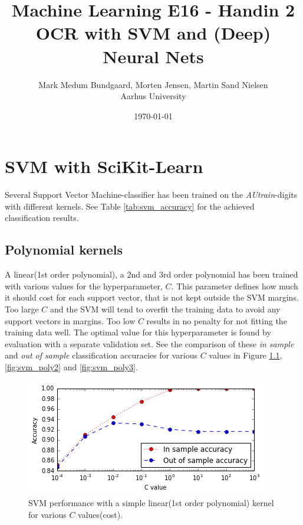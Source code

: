 \documentclass[a4paper,10pt,article,oneside,english]{memoir}
\begin{document}
	\title{Machine Learning E16 - Handin 2\\OCR with SVM and (Deep) Neural Nets}
	\author{Mark Medum Bundgaard, Morten Jensen, Martin Sand Nielsen\\ Aarhus University}
	\date{\today}
	
	\mainmatter
	\maketitle
	
	
	
	
	
	
	
\chapter{SVM with SciKit-Learn}
Several Support Vector Machine-classifier has been trained on the \emph{AUtrain}-digits with different kernels. See Table \ref{tab:svm_accuracy} for the achieved classification results. 

\section{Polynomial kernels}
A linear(1st order polynomial), a 2nd and 3rd order polynomial has been trained with various values for the hyperparameter, $C$. This parameter defines how much it should cost for each support vector, that is not kept outside the SVM margins. Too large $C$ and the SVM will tend to overfit the training data to avoid any support vectors in margins. Too low $C$ results in no penalty for not fitting the training data well. The optimal value for this hyperparameter is found by evaluation with a separate validation set. See the comparison of these \emph{in sample} and \emph{out of sample} classification accuracies for various $C$ values in Figure \ref{fig:svm_lin}, \ref{fig:svm_poly2} and \ref{fig:svm_poly3}.


\begin{figure}[h!]
	\centering
	\includegraphics[width=0.7\linewidth]{svm_lin.PNG}
	\caption{SVM performance with a simple linear(1st order polynomial) kernel for various $C$  values(cost).}
	\label{fig:svm_lin}
\end{figure}
\end{document}
